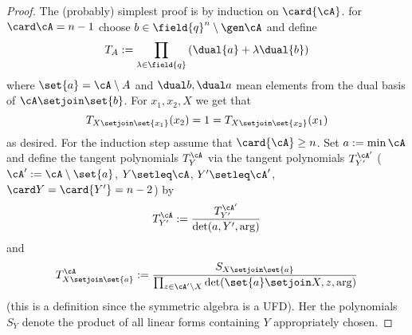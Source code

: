 
\begin{lemma}

\end{lemma}

\begin{proof}
    The (probably) simplest proof is by induction on $\card{\cA}$.
    for $\card\cA=n-1$ choose $b\in \field{q}^n\setminus\gen\cA$ and define
    $$
    T_A:=\prod_{\lambda\in\field{q}}{(\dual{a}+\lambda\dual{b})}
    $$
    where $\set{a}=\cA\setminus A$ and $\dual b, \dual a$ mean elements from the dual basis of $\cA\setjoin\set{b}$. For $x_1,x_2,X$ we get that
    $$
    T_{X\setjoin\set{x_1}}(x_2)=1=T_{X\setjoin\set{x_2}}(x_1)
    $$
    as desired.
        For the induction step assume that $\card{\cA}\geq n$. Set $a:=\min{\cA}$ and define the tangent polynomials $T^{\cA}_Y$ via the tangent polynomials $T^{\cA'}_{Y'}$ ($\cA':=\cA\setminus\set{a}$, $Y\setleq \cA$, $Y'\setleq \cA'$, $\card Y=\card{Y'}=n-2$) by
        $$
        T^{\cA}_{Y'}:=\frac{T^{\cA'}_{Y'}}{\det(a,Y',\arg)}
        $$
        and
        $$
        T^{\cA}_{X\setjoin\set{a}}:=\frac{S_{X\setjoin \set{a}}}{\prod_{z\in\cA'\setminus X}\det(\set{a}\setjoin X,z,\arg)}
        $$
        (this is a definition since the symmetric algebra is a UFD). Her the polynomials $S_Y$ denote the product of all linear forms containing $Y$ appropriately chosen.
\end{proof}